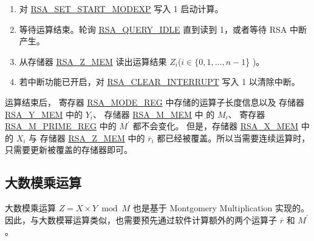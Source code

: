 \documentclass[main\_\_CN.tex]{subfiles}
\begin{document}
\begin{enumerate}
        只需要根据运算子长度，将各个运算子中有效的数据写入存储器，没有使用到的存储器可以是任意值。

    \item 对 \hyperref[fielddesc:RSASETSTARTMODEXP]{RSA\_SET\_START\_MODEXP} 写入 1 启动计算。

    \item 等待运算结束。轮询 \hyperref[fielddesc:RSAQUERYIDLE]{RSA\_QUERY\_IDLE} 直到读到 1，或者等待 RSA 中断产生。

    \item 从存储器 \hyperref[regdesc:RSAmemory]{RSA\_Z\_MEM} 读出运算结果 \begin{math}Z_{i}\end{math}(\begin{math}i \in \{ 0, 1, \dots, n-1 \end{math}\} )。

    \item 若中断功能已开启，对 \hyperref[fielddesc:RSACLEARINTERRUPT]{RSA\_CLEAR\_INTERRUPT} 写入 1 以清除中断。

\end{enumerate}

运算结束后，
寄存器 \hyperref[regdesc:RSAMODEREG]{RSA\_MODE\_REG} 中存储的运算子长度信息以及
存储器 \hyperref[regdesc:RSAmemory]{RSA\_Y\_MEM} 中的 \begin{math}Y_{i}\end{math}、
存储器 \hyperref[regdesc:RSAmemory]{RSA\_M\_MEM} 中 的 \begin{math}M_{i}\end{math}、
寄存器 \hyperref[regdesc:RSAMPRIMEREG]{RSA\_M\_PRIME\_REG} 中的 \begin{math}M^{\prime}\end{math} 都不会变化。
但是，存储器 \hyperref[regdesc:RSAmemory]{RSA\_X\_MEM} 中的 \begin{math}X_{i}\end{math} 与
存储器 \hyperref[regdesc:RSAmemory]{RSA\_Z\_MEM} 中的 \begin{math}\overline{r}_{i}\end{math}
都已经被覆盖。所以当需要连续运算时，只需要更新被覆盖的存储器即可。


\subsection{大数模乘运算}

大数模乘运算 \begin{math}Z = X \times Y \bmod M\end{math} 也是基于 Montgomery Multiplication 实现的。因此，与大数模幂运算类似，也需要预先通过软件计算额外的两个运算子
\begin{math}\overline{r}\end{math} 和
\begin{math}M^{\prime}\end{math}。
\end{document}

